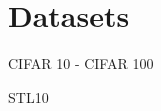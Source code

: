\section{Datasets}
\begin{frame}{CIFAR 10 - CIFAR 100}
\end{frame}

\begin{frame}{STL10}

\end{frame}
